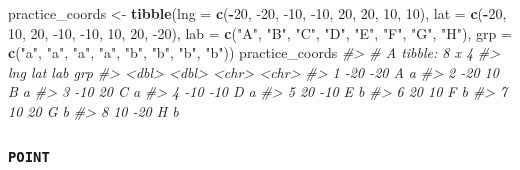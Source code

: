 \documentclass[
]{report}
\newenvironment{Shaded}{\begin{snugshade}}{\end{snugshade}}
\newcommand{\CommentTok}[1]{\textcolor[rgb]{0.56,0.35,0.01}{\textit{#1}}}
\newcommand{\DataTypeTok}[1]{\textcolor[rgb]{0.13,0.29,0.53}{#1}}
\newcommand{\DecValTok}[1]{\textcolor[rgb]{0.00,0.00,0.81}{#1}}
\newcommand{\KeywordTok}[1]{\textcolor[rgb]{0.13,0.29,0.53}{\textbf{#1}}}
\newcommand{\NormalTok}[1]{#1}
\newcommand{\OperatorTok}[1]{\textcolor[rgb]{0.81,0.36,0.00}{\textbf{#1}}}
\newcommand{\StringTok}[1]{\textcolor[rgb]{0.31,0.60,0.02}{#1}}
\begin{document}
\begin{Shaded}
\begin{Highlighting}[]
\NormalTok{practice\_coords \textless{}{-}}\StringTok{ }\KeywordTok{tibble}\NormalTok{(}\DataTypeTok{lng =} \KeywordTok{c}\NormalTok{(}\OperatorTok{{-}}\DecValTok{20}\NormalTok{, }\DecValTok{{-}20}\NormalTok{, }\DecValTok{{-}10}\NormalTok{, }\DecValTok{{-}10}\NormalTok{, }\DecValTok{20}\NormalTok{, }\DecValTok{20}\NormalTok{,  }\DecValTok{10}\NormalTok{,  }\DecValTok{10}\NormalTok{), }
                          \DataTypeTok{lat =} \KeywordTok{c}\NormalTok{(}\OperatorTok{{-}}\DecValTok{20}\NormalTok{, }\DecValTok{10}\NormalTok{, }\DecValTok{20}\NormalTok{, }\DecValTok{{-}10}\NormalTok{, }\DecValTok{{-}10}\NormalTok{,  }\DecValTok{10}\NormalTok{,  }\DecValTok{20}\NormalTok{, }\DecValTok{{-}20}\NormalTok{),}
                          \DataTypeTok{lab =} \KeywordTok{c}\NormalTok{(}\StringTok{"A"}\NormalTok{, }\StringTok{"B"}\NormalTok{, }\StringTok{"C"}\NormalTok{, }\StringTok{"D"}\NormalTok{, }\StringTok{"E"}\NormalTok{, }\StringTok{"F"}\NormalTok{, }\StringTok{"G"}\NormalTok{, }\StringTok{"H"}\NormalTok{),}
                          \DataTypeTok{grp =} \KeywordTok{c}\NormalTok{(}\StringTok{"a"}\NormalTok{, }\StringTok{"a"}\NormalTok{, }\StringTok{"a"}\NormalTok{, }\StringTok{"a"}\NormalTok{, }\StringTok{"b"}\NormalTok{, }\StringTok{"b"}\NormalTok{, }\StringTok{"b"}\NormalTok{, }\StringTok{"b"}\NormalTok{))}
\NormalTok{practice\_coords}
\CommentTok{\#\textgreater{} \# A tibble: 8 x 4}
\CommentTok{\#\textgreater{}     lng   lat lab   grp  }
\CommentTok{\#\textgreater{}   \textless{}dbl\textgreater{} \textless{}dbl\textgreater{} \textless{}chr\textgreater{} \textless{}chr\textgreater{}}
\CommentTok{\#\textgreater{} 1   {-}20   {-}20 A     a    }
\CommentTok{\#\textgreater{} 2   {-}20    10 B     a    }
\CommentTok{\#\textgreater{} 3   {-}10    20 C     a    }
\CommentTok{\#\textgreater{} 4   {-}10   {-}10 D     a    }
\CommentTok{\#\textgreater{} 5    20   {-}10 E     b    }
\CommentTok{\#\textgreater{} 6    20    10 F     b    }
\CommentTok{\#\textgreater{} 7    10    20 G     b    }
\CommentTok{\#\textgreater{} 8    10   {-}20 H     b}
\end{Highlighting}
\end{Shaded}

\hypertarget{point}{%
\subsubsection{\texorpdfstring{\texttt{POINT}}{POINT}}\label{point}}
\end{document}
